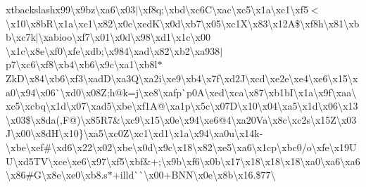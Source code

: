 xtbackslash{}x99\textbackslash{}x9bz\textbackslash{}xa6\textbackslash{}x03$\vert$\textbackslash{}xf8q;\textbackslash{}xbd\textbackslash{}xc6\+C\textbackslash{}xac\textbackslash{}xc5\textbackslash{}x1a\textbackslash{}xc1\textbackslash{}xf5$<$\textbackslash{}x10\textbackslash{}x8b\+R\textbackslash{}x1a\textbackslash{}xc1\textbackslash{}x82\textbackslash{}x0c\textbackslash{}xed\+K\textbackslash{}x0d\textbackslash{}xb7\textbackslash{}x05\textbackslash{}xc1\+X\textbackslash{}x83\textbackslash{}x12\+A\$\textbackslash{}xf8h\textbackslash{}x81\textbackslash{}xbb\textbackslash{}xc7k$\vert$\textbackslash{}xabioo\textbackslash{}xf7\textbackslash{}x01\textbackslash{}x0d\textbackslash{}x98\textbackslash{}xd1\textbackslash{}x1c\textbackslash{}x00 \textbackslash{}x1c\textbackslash{}x8e\textbackslash{}xf0\textbackslash{}xfe\textbackslash{}xdb;\textbackslash{}x984\textbackslash{}xad\textbackslash{}x82\textbackslash{}xb2\textbackslash{}xa938$\vert$p7\textbackslash{}xc6\textbackslash{}xf8\textbackslash{}xb4\textbackslash{}xb6\textbackslash{}x9c\textbackslash{}xa1\textbackslash{}xb8l$\ast$\+Zk\+D\textbackslash{}x84\textbackslash{}xb6\textbackslash{}xf3\textbackslash{}xad\+D\textbackslash{}xa3\+Q\textbackslash{}xa2i\textbackslash{}xe9\textbackslash{}xb4\textbackslash{}x7f\textbackslash{}xd2\+J\textbackslash{}xcd\textbackslash{}xe2e\textbackslash{}xe4\textbackslash{}xe6\textbackslash{}x15\textbackslash{}xa0\textbackslash{}x94\textbackslash{}x06\`{}\textbackslash{}xd0\textbackslash{}x08\+Z;h@k=j\textbackslash{}xe8\textbackslash{}xafp\`{}p0\+A\textbackslash{}xed\textbackslash{}xca\textbackslash{}x87\textbackslash{}xb1b\+I\textbackslash{}x1a\textbackslash{}x9f\textbackslash{}xaa\textbackslash{}xc5\textbackslash{}xcbq\textbackslash{}x1d\textbackslash{}x07\textbackslash{}xad5\textbackslash{}xbe\textbackslash{}xf1\+A@\textbackslash{}xa1p\textbackslash{}x5c\textbackslash{}x07\+D\textbackslash{}x10\textbackslash{}x04\textbackslash{}xa5\textbackslash{}x1d\textbackslash{}x06\textbackslash{}x13\textbackslash{}x03\$\textbackslash{}x8da(,\+F@)\textbackslash{}x85\+R7\&\textbackslash{}xc9\textbackslash{}x15\textbackslash{}x0e\textbackslash{}x94\textbackslash{}xe6@4\textbackslash{}xa20\+Va\textbackslash{}x8c\textbackslash{}xc2s\textbackslash{}x15\+Z\textbackslash{}x03\+J\textbackslash{}x00\textbackslash{}x8d\+H\textbackslash{}x10\}\textbackslash{}xa5\textbackslash{}xc0\+Z\textbackslash{}xc1\textbackslash{}xd1\textbackslash{}x1a\textbackslash{}x94\textbackslash{}xa0u\textbackslash{}x14k-\/\textbackslash{}xbe\textbackslash{}xef\#\textbackslash{}xd6\textbackslash{}x22\textbackslash{}x02\textbackslash{}xbe\textbackslash{}x0d\textbackslash{}x9c\textbackslash{}x18\textbackslash{}x82\textbackslash{}xe5\textbackslash{}xa6\textbackslash{}x1cp\textbackslash{}xbc0/o\textbackslash{}xfe\textbackslash{}x19\+U\+U\textbackslash{}xd5\+T\+V\textbackslash{}xce\textbackslash{}xe6\textbackslash{}x97\textbackslash{}xf5\textbackslash{}xbf\&+;\textbackslash{}x9b\textbackslash{}xf6\textbackslash{}x0b\textbackslash{}x17\textbackslash{}x18\textbackslash{}x18\textbackslash{}x18\textbackslash{}xa0\textbackslash{}xa6\textbackslash{}xa6\textbackslash{}x86\#\+G\textbackslash{}x8e\textbackslash{}xe0\textbackslash{}xb8.\+s$\ast$+illd\`{}\`{}\textbackslash{}x00+\+B\+N\+N\textbackslash{}x0e\textbackslash{}x8b\textbackslash{}x16.\$77\textbackslash{}